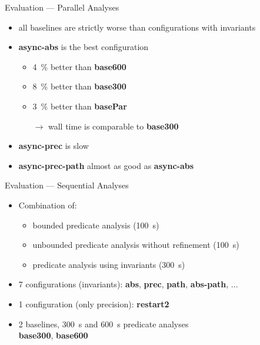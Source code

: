 \documentclass{beamer}
\begin{document}
\begin{frame}{Evaluation --- Parallel Analyses}
 \begin{itemize}
  \item all baselines are strictly worse than configurations with invariants
  \item \textbf{async-abs} is the best configuration
  \begin{itemize}
  \item \SI{4}{\percent} better than \textbf{base600}
  \item \SI{8}{\percent} better than \textbf{base300}
  \item \SI{3}{\percent} better than \textbf{basePar}
  \item[$\rightarrow$] wall time is comparable to \textbf{base300}
  \end{itemize}
  
 \item \textbf{async-prec} is slow
 \item \textbf{async-prec-path} almost as good as \textbf{async-abs}
 \end{itemize}

\end{frame}

\begin{frame}{Evaluation --- Sequential Analyses}
  \begin{itemize}
  \item Combination of:
  \begin{itemize}
  \item bounded predicate analysis (\SI{100}{\second})
  \item unbounded predicate analysis without refinement (\SI{100}{\second})
  \item predicate analysis using invariants (\SI{300}{\second})
 \end{itemize}
 \item 7 configurations (invariants):
 \textbf{abs}, \textbf{prec}, \textbf{path}, \textbf{abs-path}, ...
 \item 1 configuration (only precision): \textbf{restart2}
 \item[]
 \item 2 baselines, \SI{300}{\second} and \SI{600}{\second} predicate analyses\\
 \textbf{base300}, \textbf{base600}
 \end{itemize}
\end{frame}
\end{document}
